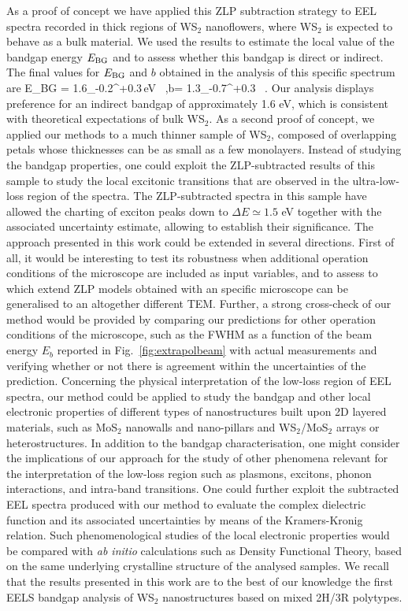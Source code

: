 As a proof of concept we have applied this ZLP subtraction
strategy to EEL spectra recorded in thick regions of WS$_2$ nanoflowers, 
where WS$_2$ is expected to behave as a bulk material.
%
We used the results to estimate the local value of the bandgap energy $E_{\rm BG}$
and to assess whether this bandgap is direct or indirect.
%
The final values for $E_{\rm BG}$ and $b$ obtained in the analysis of this specific spectrum are
E_{\rm BG} = 1.6_{-0.2}^{+0.3}\,{\rm eV} \, ,\quad b= 1.3_{-0.7}^{+0.3} \, .
%
Our analysis displays preference for an indirect bandgap of approximately 1.6 eV,
which is consistent with 
theoretical expectations of bulk WS$_2$.
%
As a second proof of concept, we applied our methods to a much thinner sample of WS$_2$, 
composed of overlapping petals whose thicknesses can be as small as a few monolayers.
%
Instead of studying the bandgap properties, one could exploit the ZLP-subtracted results 
of this sample to study the local
excitonic transitions that are observed in the ultra-low-loss region of the spectra.
%
The ZLP-subtracted spectra in this sample have allowed
the charting of exciton peaks down to $\Delta E\simeq 1.5$ eV together with
the associated uncertainty estimate, allowing to establish their significance.
%
\newparagraph
The approach presented in this work could be extended
in several directions.
%
First of all, it would be interesting to test its robustness when additional
operation conditions of the microscope are included as input variables,
and to assess to which extend ZLP models obtained with an specific microscope
can be generalised to an altogether different TEM.
%
Further, a strong cross-check of our method would be provided by comparing
our predictions for other operation conditions of the microscope, such
as the FWHM as a function of the beam energy $E_b$ reported in Fig.~\ref{fig:extrapolbeam}
with actual measurements and verifying whether or not there is agreement within the
uncertainties of the prediction.
%
Concerning the physical interpretation of the low-loss region of EEL
spectra, our method could be applied to study the bandgap
and other local electronic properties of different types
of nanostructures built upon 2D layered materials, such as MoS$_2$ nanowalls
and nano-pillars and WS$_2$/MoS$_2$ arrays or heterostructures.
%
In addition to the bandgap characterisation, one might
consider the implications of our approach for the study
of other phenomena relevant for the interpretation of the low-loss
region such as  plasmons, excitons, phonon interactions, and
intra-band transitions.
%
One could   further exploit the subtracted EEL spectra produced
with our method to evaluate the complex dielectric function and its associated
uncertainties by means of the Kramers-Kronig relation.
%
Such phenomenological studies of the local electronic properties would be compared
with {\it ab initio} calculations such as Density Functional Theory, based
on the same underlying crystalline structure of the analysed samples.
%
We recall that the results
presented in this work are to the best of our knowledge the first EELS bandgap
analysis of WS$_2$ nanostructures based on mixed 2H/3R polytypes.

